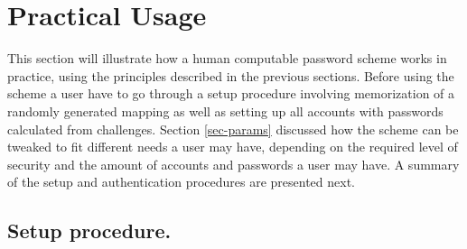 \section{Practical Usage}\label{usage}
This section will illustrate how a human computable password scheme works in practice, using the principles described in the previous sections. Before using the scheme a user have to go through a setup procedure involving memorization of a randomly generated mapping as well as setting up all accounts with passwords calculated from challenges. Section \ref{sec-params} discussed how the scheme can be tweaked to fit different needs a user may have, depending on the required level of security and the amount of accounts and passwords a user may have. A summary of the setup and authentication procedures are presented next.
\subsection{Setup procedure.}
